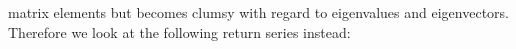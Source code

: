 \message{ !name(thesis.tex)}\documentclass{report}
\author{Xie Xiaolei}
\date{\today}
\begin{document}
 matrix
elements but becomes clumsy with regard to eigenvalues and
eigenvectors. Therefore we look at the following return series
instead:

\end{document}
